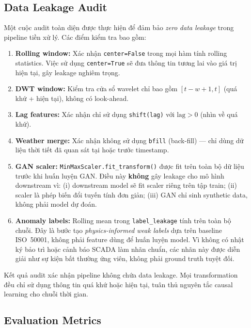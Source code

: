 \subsection{Data Leakage Audit}

Một cuộc audit toàn diện được thực hiện để đảm bảo \textit{zero data leakage} trong pipeline tiền xử lý.
Các điểm kiểm tra bao gồm:

\begin{enumerate}
    \item \textbf{Rolling window:} Xác nhận \texttt{center=False} trong mọi hàm tính rolling statistics. Việc sử dụng \texttt{center=True} sẽ đưa thông tin tương lai vào giá trị hiện tại, gây leakage nghiêm trọng.
    \item \textbf{DWT window:} Kiểm tra cửa sổ wavelet chỉ bao gồm $[t-w+1, t]$ (quá khứ + hiện tại), không có look-ahead.
    \item \textbf{Lag features:} Xác nhận chỉ sử dụng \texttt{shift(lag)} với $\text{lag} > 0$ (nhìn về quá khứ).
    \item \textbf{Weather merge:} Xác nhận không sử dụng \texttt{bfill} (back-fill) --- chỉ dùng dữ liệu thời tiết đã quan sát tại hoặc trước timestamp.
    \item \textbf{GAN scaler:} \texttt{MinMaxScaler.fit\_transform()} được fit trên toàn bộ dữ liệu trước khi huấn luyện GAN. Điều này \textbf{không} gây leakage cho mô hình downstream vì: (i) downstream model sẽ fit scaler riêng trên tập train; (ii) scaler là phép biến đổi tuyến tính đơn giản; (iii) GAN chỉ sinh synthetic data, không phải model dự đoán.
    \item \textbf{Anomaly labels:} Rolling mean trong \texttt{label\_leakage} tính trên toàn bộ chuỗi. Đây là bước tạo \textit{physics-informed weak labels} dựa trên baseline ISO~50001, không phải feature dùng để huấn luyện model. Vì không có nhật ký bảo trì hoặc cảnh báo SCADA làm nhãn chuẩn, các nhãn này được diễn giải như sự kiện bất thường ứng viên, không phải ground truth tuyệt đối.
\end{enumerate}

Kết quả audit xác nhận pipeline không chứa data leakage.
Mọi transformation đều chỉ sử dụng thông tin quá khứ hoặc hiện tại,
tuân thủ nguyên tắc causal learning cho chuỗi thời gian.

\subsection{Evaluation Metrics}

